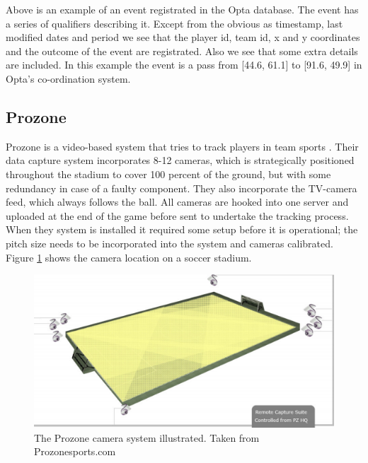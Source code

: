 Above is an example of an event registrated in the Opta database. The event has a series of qualifiers describing it. Except from the obvious as timestamp, last modified dates and period we see that the player id, team id, x and y coordinates and the outcome of the event are registrated. Also we see that some extra details are included. In this example the event is a pass from [44.6, 61.1] to [91.6, 49.9] in Opta’s co-ordination system. 

\subsection{Prozone}

Prozone is a video-based system that tries to track players in team sports \cite{Prozone:indepth}. Their data capture system incorporates 8-12 cameras, which is strategically positioned throughout the stadium to cover 100 percent of the ground, but with some redundancy in case of a faulty component. They also incorporate the TV-camera feed, which always follows the ball. All cameras are hooked into one server and uploaded at the end of the game before sent to undertake the tracking process. When they system is installed it required some setup before it is operational; the pitch size needs to be incorporated into the system and cameras calibrated. Figure \ref{fig:prozonecam} shows the camera location on a soccer stadium.

\begin{figure}[ht!]
\centering
\includegraphics[width=1\textwidth]{images/general/prozonecam.png}
\caption{The Prozone camera system illustrated. Taken from Prozonesports.com}
\label{fig:prozonecam}
\end{figure}

